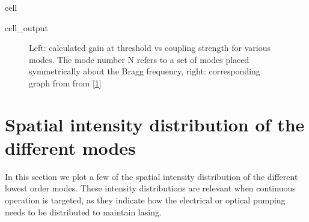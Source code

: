 \documentclass[a4paper,10pt,english,openany,oneside]{jupyterBook}
\begin{document}
\begin{sphinxuseclass}{cell}\begin{sphinxVerbatimOutput}

\begin{sphinxuseclass}{cell_output}
\begin{figure}[htbp]
\centering
\capstart

\noindent{}
\caption{Left: calculated gain at threshold vs coupling strength for various modes. The mode number N refers to a set of modes placed symmetrically about the Bragg frequency, right: corresponding graph from from {[}\hyperlink{cite.bib:id3}{1}{]}}\label{\detokenize{Kogelnik-Shank_Coupled-Wave-Theory_DFB-Lasers:kogelnik9c}}\end{figure}

\end{sphinxuseclass}\end{sphinxVerbatimOutput}

\end{sphinxuseclass}

\section{Spatial intensity distribution of the different modes}
\label{\detokenize{Kogelnik-Shank_Coupled-Wave-Theory_DFB-Lasers:spatial-intensity-distribution-of-the-different-modes}}
\sphinxAtStartPar
In this section we plot a few of the spatial intensity distribution of the different lowest order modes. These intensity distributions are relevant when continuous operation is targeted, as they indicate how the electrical or optical pumping needs to be distributed to maintain lasing.
\end{document}
